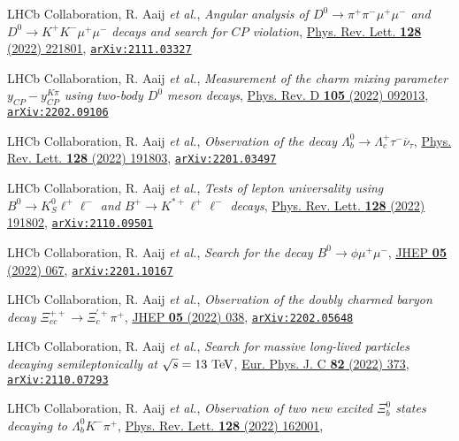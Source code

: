 \documentclass[a4paper, 11pt]{article}
\newenvironment{cvcontent}{
  \leftskip=0.5cm\rightskip=0cm
  \noindent\ignorespaces}{\par}
\newcommand{\arxiv}[1]{\href{https://arxiv.org/abs/#1}{\texttt{arXiv:#1}}}
\begin{document}
\begin{cvcontent}
\begin{enumerate}[label={[\arabic*]}, leftmargin=1.5cm]
    \sloppy
    \item LHCb Collaboration, R. Aaij \emph{et al.}, 
    \emph{Angular analysis of $D^0 \to \pi^+\pi^-\mu^+\mu^-$ and $D^0 \to K^+K^-\mu^+\mu^-$ decays and search for $CP$ violation},
    \href{https://link.aps.org/doi/10.1103/PhysRevLett.128.221801}{Phys. Rev. Lett. \textbf{128} (2022) 221801},
    \arxiv{2111.03327}
    \item LHCb Collaboration, R. Aaij \emph{et al.},
    \emph{Measurement of the charm mixing parameter $y_{CP} - y_{CP}^{K\pi}$ using two-body $D^0$ meson decays},
    \href{https://link.aps.org/doi/10.1103/PhysRevD.105.092013}{Phys. Rev. D \textbf{105} (2022) 092013},
    \arxiv{2202.09106}
    \item LHCb Collaboration, R. Aaij \emph{et al.}, 
    \emph{Observation of the decay $\Lambda_b^0 \rightarrow \Lambda_c^+\tau^-\overline{\nu}_{\tau}$},
    \href{https://link.aps.org/doi/10.1103/PhysRevLett.128.191803}{Phys. Rev. Lett. \textbf{128} (2022) 191803},
    \arxiv{2201.03497}
    \item LHCb Collaboration, R. Aaij \emph{et al.}, 
    \emph{Tests of lepton universality using $B^0\to K^0_S \ell^+ \ell^-$ and $B^+\to K^{*+}\ell^+\ell^-$ decays},
    \href{https://link.aps.org/doi/10.1103/PhysRevLett.128.191802}{Phys. Rev. Lett. \textbf{128} (2022) 191802},
    \arxiv{2110.09501}
    \item LHCb Collaboration, R. Aaij \emph{et al.},
    \emph{Search for the decay $B^0\to\phi\mu^+\mu^-$},
    \href{https://doi.org/10.1007/JHEP05(2022)067}{JHEP \textbf{05} (2022) 067},
    \arxiv{2201.10167}
    \item LHCb Collaboration, R. Aaij \emph{et al.},
    \emph{Observation of the doubly charmed baryon decay $\Xi_{cc}^{++}\to \Xi_{c}^{'+}\pi^{+}$},
    \href{https://doi.org/10.1007/JHEP05(2022)038}{JHEP \textbf{05} (2022) 038},
    \arxiv{2202.05648}
    \item LHCb Collaboration, R. Aaij \emph{et al.}, 
    \emph{Search for massive long-lived particles decaying semileptonically at $\sqrt{s} = 13~\rm{TeV}$},
    \href{https://doi.org/10.1140/epjc/s10052-022-10186-3}{Eur. Phys. J. C \textbf{82} (2022) 373},
    \arxiv{2110.07293}
    \item LHCb Collaboration, R. Aaij \emph{et al.}, 
    \emph{Observation of two new excited $\Xi_b^0$ states decaying to  $\Lambda_b^0 K^- \pi^+$},
    \href{https://link.aps.org/doi/10.1103/PhysRevLett.128.162001}{Phys. Rev. Lett. \textbf{128} (2022) 162001},

\end{enumerate}
\end{cvcontent}
\end{document}
